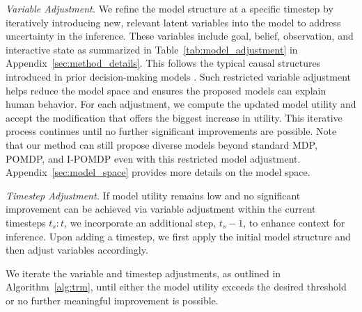 \textit{Variable Adjustment.} We refine the model structure at a specific timestep by iteratively introducing new, relevant latent variables into the model to address uncertainty in the inference. These variables include goal, belief, observation, and interactive state as summarized in Table~\ref{tab:model_adjustment} in Appendix~\ref{sec:method_details}. This follows the typical causal structures introduced in prior decision-making models \citep[e.g.,][]{kaelbling1998planning,baker2017rational,ullman2009help,gmytrasiewicz2005framework}. Such restricted variable adjustment helps reduce the model space and ensures the proposed models can explain human behavior. For each adjustment, we compute the updated model utility and accept the modification that offers the biggest increase in utility. This iterative process continues until no further significant improvements are possible. Note that our method can still propose diverse models beyond standard MDP, POMDP, and I-POMDP even with this restricted model adjustment. Appendix~\ref{sec:model_space} provides more details on the model space. 



\textit{Timestep Adjustment.} If model utility remains low and no significant improvement can be achieved via variable adjustment within the current timesteps $t_s:t$, we incorporate an additional step, $t_s-1$, to enhance context for inference. Upon adding a timestep, we first apply the initial model structure and then adjust variables accordingly.

We iterate the variable and timestep adjustments, as outlined in Algorithm~\ref{alg:trm}, until either the model utility exceeds the desired threshold or no further meaningful improvement is possible.